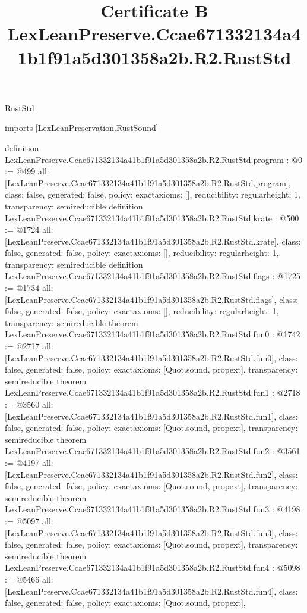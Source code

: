 \begin{lexlean}{RustStd}
\title{Certificate B LexLeanPreserve.Ccae671332134a41b1f91a5d301358a2b.R2.RustStd}
\begin{coremodule}
imports [LexLeanPreservation.RustSound]

definition LexLeanPreserve.Ccae671332134a41b1f91a5d301358a2b.R2.RustStd.program : @0 := @499 {
  all: [LexLeanPreserve.Ccae671332134a41b1f91a5d301358a2b.R2.RustStd.program],
  class: false,
  generated: false,
  policy: exact{axioms: []},
  reducibility: regular{height: 1},
  transparency: semireducible
}
definition LexLeanPreserve.Ccae671332134a41b1f91a5d301358a2b.R2.RustStd.krate : @500 := @1724 {
  all: [LexLeanPreserve.Ccae671332134a41b1f91a5d301358a2b.R2.RustStd.krate],
  class: false,
  generated: false,
  policy: exact{axioms: []},
  reducibility: regular{height: 1},
  transparency: semireducible
}
definition LexLeanPreserve.Ccae671332134a41b1f91a5d301358a2b.R2.RustStd.flags : @1725 := @1734 {
  all: [LexLeanPreserve.Ccae671332134a41b1f91a5d301358a2b.R2.RustStd.flags],
  class: false,
  generated: false,
  policy: exact{axioms: []},
  reducibility: regular{height: 1},
  transparency: semireducible
}
theorem LexLeanPreserve.Ccae671332134a41b1f91a5d301358a2b.R2.RustStd.fun0 : @1742 := @2717 {
  all: [LexLeanPreserve.Ccae671332134a41b1f91a5d301358a2b.R2.RustStd.fun0],
  class: false,
  generated: false,
  policy: exact{axioms: [Quot.sound, propext]},
  transparency: semireducible
}
theorem LexLeanPreserve.Ccae671332134a41b1f91a5d301358a2b.R2.RustStd.fun1 : @2718 := @3560 {
  all: [LexLeanPreserve.Ccae671332134a41b1f91a5d301358a2b.R2.RustStd.fun1],
  class: false,
  generated: false,
  policy: exact{axioms: [Quot.sound, propext]},
  transparency: semireducible
}
theorem LexLeanPreserve.Ccae671332134a41b1f91a5d301358a2b.R2.RustStd.fun2 : @3561 := @4197 {
  all: [LexLeanPreserve.Ccae671332134a41b1f91a5d301358a2b.R2.RustStd.fun2],
  class: false,
  generated: false,
  policy: exact{axioms: [Quot.sound, propext]},
  transparency: semireducible
}
theorem LexLeanPreserve.Ccae671332134a41b1f91a5d301358a2b.R2.RustStd.fun3 : @4198 := @5097 {
  all: [LexLeanPreserve.Ccae671332134a41b1f91a5d301358a2b.R2.RustStd.fun3],
  class: false,
  generated: false,
  policy: exact{axioms: [Quot.sound, propext]},
  transparency: semireducible
}
theorem LexLeanPreserve.Ccae671332134a41b1f91a5d301358a2b.R2.RustStd.fun4 : @5098 := @5466 {
  all: [LexLeanPreserve.Ccae671332134a41b1f91a5d301358a2b.R2.RustStd.fun4],
  class: false,
  generated: false,
  policy: exact{axioms: [Quot.sound, propext]},
}
\end{coremodule}
\end{lexlean}
